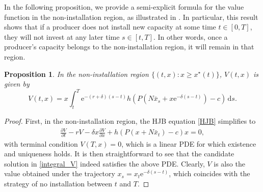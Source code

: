 \documentclass[12pt]{article}
\newtheorem{proposition}{Proposition}[section]
\def\erm{\mathrm{e}}
\def\drm{\mathrm{d}}
\begin{document}
In the following proposition, we provide a semi-explicit formula for the value function in the non-installation region, as illustrated in . In particular, this result shows that if a producer does not install new capacity at some time \(t \in [0,T]\), they will not invest at any later time \(s \in [t,T]\). In other words, once a producer's capacity belongs to the non-installation region, it will remain in that region.
\begin{proposition}\label{proposition_V}
In the non-installation region $\{(t,x):x\geq x^\star(t)\}$, $V(t,x)$ is given by 
\begin{equation}\label{integral_V}
    V(t,x)= x\int_{t}^{T} \erm^{-(r+\delta)(s-t)}h(P(N\bar{x}_s+x \erm^{-\delta(s-t)})-c)\, \drm s.
\end{equation}
\end{proposition}
\begin{proof}
First, in the non-installation region, the HJB equation \eqref{HJB} simplifies to
\begin{align*}
\frac{\partial V}{\partial t}-rV-\delta x\frac{\partial V}{\partial x}+h(P(x+N\bar{x}_t)-c)x=0,
\end{align*}
with terminal condition $V(T,x)=0$, which is a linear PDE for which existence and uniqueness holds. It is then straightforward to see that the candidate solution in \eqref{integral_V} indeed satisfies the above PDE. 
Clearly, $V$ is also the value obtained under the trajectory $x_s=x_t \erm^{-\delta(s-t)}$, which coincides with the strategy of no installation between $t$ and $T$. 
\end{proof}
\end{document}
